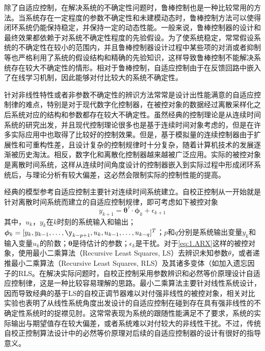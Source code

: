 除了自适应控制，在解决系统的不确定性问题时，鲁棒控制也是一种比较常用的方法。当系统存在一定程度的参数不确定性和未建模动态时，鲁棒控制方法可以使得闭环系统仍能保持稳定，并保持一定的动态性能。一般来说，鲁棒控制器的设计和最终效果都依赖于对系统不确定性程度的先验假设。为了使系统稳定，常常假设系统的不确定性在较小的范围内，并且鲁棒控制器设计过程中某些项的对消或者抑制等也严格利用了系统的假设结构和精确的先验知识，这样导致鲁棒控制不能解决系统存在较大不确定性的情形。相对于鲁棒控制，自适应控制由于在反馈回路中嵌入了在线学习机制，因此能够对付比较大的系统不确定性。

针对非线性特性或者非参数不确定性的辨识方法常常是设计出性能满意的自适应控制律的难点，特别是对于现代数字化控制器，在被控对象的数据经过离散采样化之后系统对应的结构和参数都存在较大不确定性。虽然经典的控制理论是从连续时间系统的研究出发，并且现代控制理论很多也是基于连续时间对象考虑的，但是在许多实际应用中也取得了比较好的控制效果。但是，基于模拟量的连续控制器由于扩展性和可重构性差，且设计复杂的控制规律时十分复杂，随着计算机技术的发展逐渐被历史淘汰。相反，数字化和离散化控制器越来越被广泛应用。实际的被控对象是离散时间系统，这样从连续时间角度设计的控制器嵌入到实际过程中形成闭环系统后，与理论分析有较大偏差，这必然会限制实际的控制性能的提高。

经典的模型参考自适应控制主要针对连续时间系统建立。自校正控制从一开始就是针对离散时间系统而建立的自适应控制规律，即可考虑如下被控对象
\begin{equation}%
\label{eq:1.ARX}
y_{k+1} = \bm{\theta}^{\tau}\cdot\bm{\phi}_{k} + \epsilon_{k+1}
\end{equation}
其中，$u_{k}$，$y_{k}$在$k$时刻的系统输入和输出；$\bm{\phi}_{k} = [y_{k},y_{k-1},\ldots,\y_{k-p+1},u_{k},u_{k-1},\ldots,u_{k-q}]^{T}$；$p$和$q$分别是系统输出变量$y_{k}$和输入变量$u_{k}$的阶数；$\bm{\theta}$是待估计的参数；$\epsilon_{k}$是干扰。对于\eqref{eq:1.ARX}这样的被控对象，使用最小二乘算法（Recursive Least Squares, LS）去辨识未知参数$\theta$，或者递推最小二乘算法（Recursive Least Squares, RLS）及其诸多变体（如加入遗忘因子的RLS。在解决实际问题时，自校正控制采用参数辨识和必然等价原理设计自适应控制律，这是一种比较容易理解的思路。最小二乘算法主要针对线性系统设计，因而导致经典的基于LS的自校正调节器难以对付强非线性的被控对象，相关对比实验也表明了从线性系统角度出发设计的自适应控制在碰到存在具有强非线性的不确定性系统时的捉襟见肘。这常常表现为系统的跟随性能满足不了要求，系统的实际输出与期望值存在较大偏差，或者系统难以对付较大的非线性干扰。不过，传统自校正控制算法设计中的必然等价原理对后续的自适应控制器的设计有很好的指导意义。

